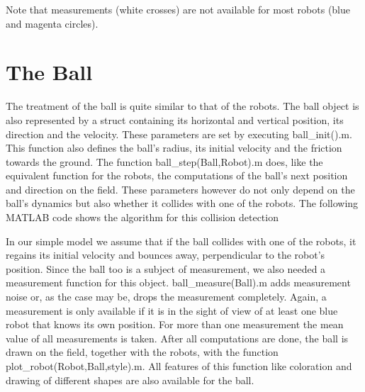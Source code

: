 Note that measurements (white crosses) are not available for most robots (blue and magenta circles).


\section{The Ball}

The treatment of the ball is quite similar to that of the robots. The ball object is also represented by a struct containing its horizontal and vertical position, its direction and the velocity. These parameters are set by executing {\selectfont ball\_init().m}. This function also defines the ball's radius, its initial velocity and the friction towards the ground. The function {\selectfont ball\_step(Ball,Robot).m} does, like the equivalent function for the robots, the computations of the ball's next position and direction on the field. These parameters however do not only depend on the ball's dynamics but also whether it collides with one of the robots. The following MATLAB code shows the algorithm for this collision detection


\parskip 20pt

In our simple model we assume that if the ball collides with one of the robots, it regains its initial velocity and bounces away, perpendicular to the robot's position. Since the ball too is a subject of measurement, we also needed a measurement function for this object. {\selectfont ball\_measure(Ball).m} adds measurement noise or, as the case may be, drops the measurement completely. Again, a measurement is only available if it is in the sight of view of at least one blue robot that knows its own position. For more than one measurement the mean value of all measurements is taken. After all computations are done, the ball is drawn on the field, together with the robots, with the function {\selectfont plot\_robot(Robot,Ball,style).m}. All features of this function like coloration and drawing of different shapes are also available for the ball.
